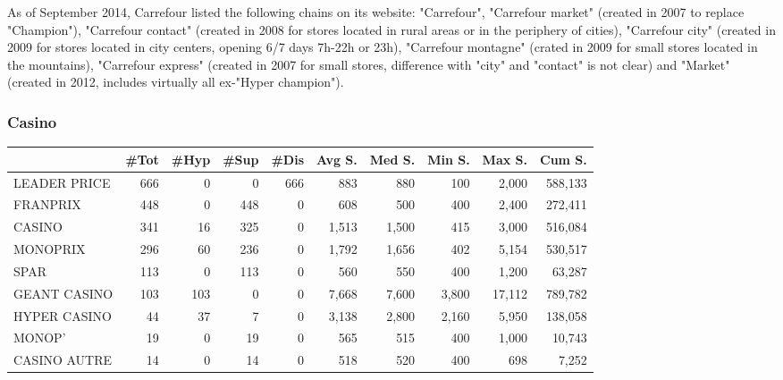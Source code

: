 \documentclass[11pt]{article}
\begin{document}
As of September 2014, Carrefour listed the following chains on its website: "Carrefour", "Carrefour market" (created in 2007 to replace "Champion"), "Carrefour contact" (created in 2008 for stores located in rural areas or in the periphery of cities), "Carrefour city" (created in 2009 for stores located in city centers, opening 6/7 days 7h-22h or 23h), "Carrefour montagne" (crated in 2009 for small stores located in the mountains), "Carrefour express" (created in 2007 for small stores, difference with "city" and "contact" is not clear) and "Market" (created in 2012, includes virtually all ex-"Hyper champion").

\subsubsection{Casino}

\begin{table}[H]
\footnotesize
\setlength{\tabcolsep}{2pt}

\begin{tabular}{lrrrrrrrrr}
\toprule
{} &       \#Tot &       \#Hyp &       \#Sup &       \#Dis &     Avg S. &     Med S. &     Min S. &     Max S. &     Cum S. \\
\midrule
LEADER PRICE &        666 &          0 &          0 &        666 &        883 &        880 &        100 &      2,000 &    588,133 \\
FRANPRIX     &        448 &          0 &        448 &          0 &        608 &        500 &        400 &      2,400 &    272,411 \\
CASINO       &        341 &         16 &        325 &          0 &      1,513 &      1,500 &        415 &      3,000 &    516,084 \\
MONOPRIX     &        296 &         60 &        236 &          0 &      1,792 &      1,656 &        402 &      5,154 &    530,517 \\
SPAR         &        113 &          0 &        113 &          0 &        560 &        550 &        400 &      1,200 &     63,287 \\
GEANT CASINO &        103 &        103 &          0 &          0 &      7,668 &      7,600 &      3,800 &     17,112 &    789,782 \\
HYPER CASINO &         44 &         37 &          7 &          0 &      3,138 &      2,800 &      2,160 &      5,950 &    138,058 \\
MONOP'       &         19 &          0 &         19 &          0 &        565 &        515 &        400 &      1,000 &     10,743 \\
CASINO AUTRE &         14 &          0 &         14 &          0 &        518 &        520 &        400 &        698 &      7,252 \\
\bottomrule
\end{tabular}

\end{table}
\end{document}
